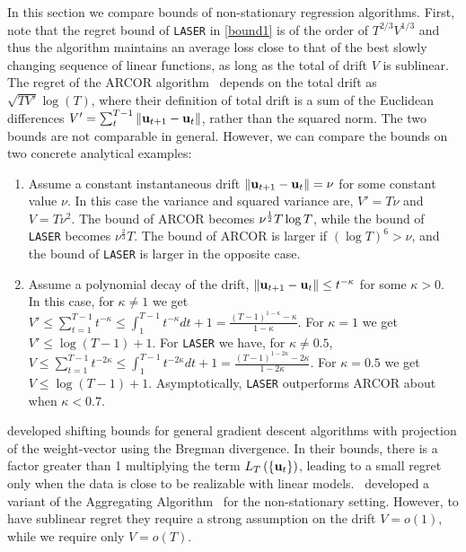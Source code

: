 In this section we compare bounds of non-stationary regression algorithms. First, note that the regret bound of \texttt{LASER} in \eqref{bound1} is of the order of $T^{2/3} V^{1/3}$ and thus the algorithm maintains an average loss close to that of the best slowly changing sequence of linear functions, as long as the total of drift $V$ is sublinear.
The regret of the ARCOR algorithm~\citep{VaitsCr11} depends on the total drift as $\sqrt{T V'}\log(T)$, where their definition of total drift is a sum of the Euclidean differences $V'=\sum_t^{T-1} \Vert \mathbf{u}_{t+1}-\mathbf{u}_{t}\Vert$, rather than the squared norm.
The two bounds are not comparable in general. However, we can compare the bounds on two concrete analytical examples:
\begin{enumerate}
\item Assume a
constant instantaneous drift $\Vert\mathbf{u}_{t+1}-\mathbf{u}_{t}\Vert=\nu$ for
some constant value $\nu$. In this case the variance and squared variance are,
$V'=T\nu$ and $V=T\nu^2$. The bound of ARCOR becomes
$ \nu^{\frac{1}{2}}T\log T$, while the bound of \texttt{LASER} becomes $\nu^\frac{2}{3}T$.
The bound of ARCOR is larger if $(\log T)^6 > \nu$, and the bound of
\texttt{LASER} is larger in the opposite case.
\item Assume a polynomial decay of the drift,
$\Vert\mathbf{u}_{t+1}-\mathbf{u}_{t}\Vert \leq t^{-\kappa}$ for some $\kappa > 0$.
In this case, for $\kappa \neq 1$ we get $V' \leq \sum^{T-1}_{t=1} t^{-\kappa} \leq \int^{T-1}_1 t^{-\kappa}  dt+1=\frac{(T-1)^{1-\kappa}-\kappa}{1-\kappa}$. For $\kappa=1$ we get $V' \leq \log(T-1)+1$.
For \texttt{LASER} we have, for $\kappa \neq 0.5$, $V \leq \sum^{T-1}_{t=1} t^{-2\kappa} \leq \int^{T-1}_1 t^{-2\kappa}  dt+1=\frac{(T-1)^{1-2\kappa}-2\kappa}{1-2\kappa}$. For $\kappa=0.5$ we get $V \leq \log(T-1)+1$.
Asymptotically, \texttt{LASER} outperforms ARCOR about when $\kappa < 0.7$.
\end{enumerate}

\cite{HerbsterW01} developed shifting bounds for general
gradient descent algorithms with projection of the weight-vector using
the Bregman divergence. In their bounds, there is a factor greater
than 1 multiplying the term $L_T\left({\left\{{\mathbf{u}_{t}}\right\}}\right)$, leading to a
small regret only when the data is close to be realizable with
linear models.~\cite{BusuttilK07} developed a variant of the Aggregating Algorithm~\citep{vovkAS} for the non-stationary setting. However, to have sublinear regret they require a strong
assumption on the drift $V=o(1)$, while we require only
$V=o(T)$.

